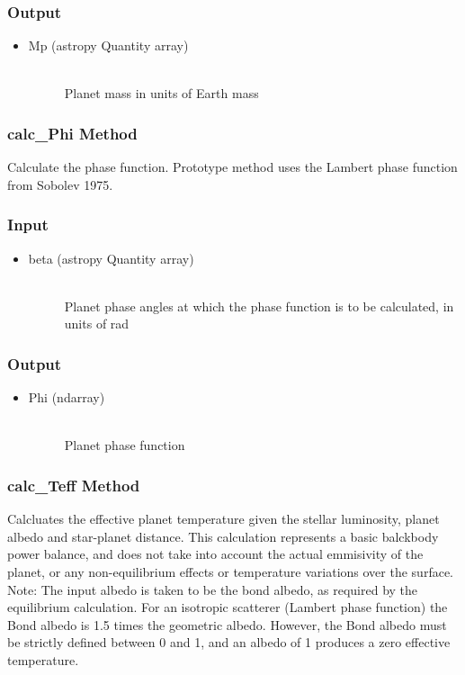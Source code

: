\documentclass[cleanfoot]{asme2ej}
\begin{document}
\subsubsection*{Output}
\begin{itemize}
\item
\begin{description}
    \item[Mp (astropy Quantity array)] \hfill \\ Planet mass in units of Earth mass
\end{description}
\end{itemize}

\subsubsection{calc\_Phi Method} \label{sec:calcphitask}
Calculate the phase function. Prototype method uses the Lambert phase function from Sobolev 1975.
\subsubsection*{Input}
\begin{itemize}
\item
\begin{description}
    \item[beta (astropy Quantity array)] \hfill \\ Planet phase angles at which the phase function is to be calculated, in units of rad
\end{description}
\end{itemize}
\subsubsection*{Output}
\begin{itemize}
\item
\begin{description}
    \item[Phi (ndarray)] \hfill \\ Planet phase function
\end{description}
\end{itemize}

\subsubsection{calc\_Teff Method} \label{sec:calcteff}
Calcluates the effective planet temperature given the stellar luminosity, planet albedo and star-planet distance. This calculation represents a basic balckbody power balance, and does not take into account the actual emmisivity of the planet, or any non-equilibrium effects or temperature variations over the surface. \\
Note:  The input albedo is taken to be the bond albedo, as required by the equilibrium calculation. For an isotropic scatterer (Lambert phase function) the Bond albedo is 1.5 times the geometric albedo. However, the Bond albedo must be strictly defined between 0 and 1, and an albedo of 1 produces a zero effective temperature.
\end{document}
